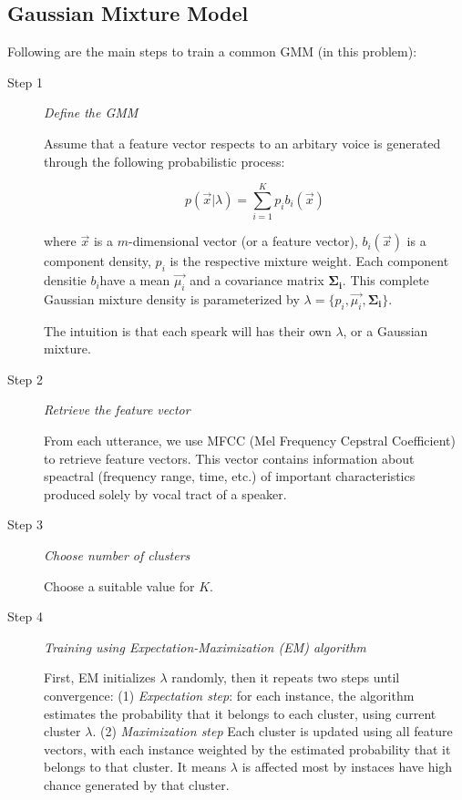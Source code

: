 \subsection*{Gaussian Mixture Model}

Following are the main steps to train a common GMM (in this problem):

\begin{description}

	\item[Step 1] \emph{Define the GMM}
	
	Assume that a feature vector respects to an arbitary voice is generated through the following probabilistic process:
	
	\begin{equation*}
		p(\vec{x} \vert \lambda) = \sum_{i = 1}^K p_ib_i(\vec{x})
	\end{equation*}
	
	where $\vec{x}$ is a $m$-dimensional vector (or a feature vector), $b_i(\vec{x})$ is a component density, $p_i$ is the respective mixture weight. Each component densitie $b_i $have a mean $\vec{\mu_i}$ and a covariance matrix $\bm{\Sigma_i}$. This complete Gaussian mixture density is parameterized by $\lambda = \{p_i, \vec{\mu_i}, \bm{\Sigma_i} \}$.
	
	The intuition is that each speark will has their own $\lambda$, or a Gaussian mixture.
	
	\item[Step 2] \emph{Retrieve the feature vector}
	
	From each utterance, we use MFCC (Mel Frequency Cepstral Coefficient) to retrieve feature vectors. This vector contains information about speactral (frequency range, time, etc.) of important characteristics produced solely by vocal tract of a speaker.
	
	\item[Step 3] \emph{Choose number of clusters}
	
	Choose a suitable value for $K$.
	
	\item[Step 4] \emph{Training using Expectation-Maximization (EM) algorithm} 
	
	First, EM initializes $\lambda$ randomly, then it repeats two steps until convergence: (1) \emph{Expectation step}: for each instance, the algorithm estimates the probability that it belongs to each cluster, using current cluster $\lambda$. (2) \emph{Maximization step} Each cluster is updated using all feature vectors, with each instance weighted by the estimated probability that it belongs to that cluster. It means $\lambda$ is affected most by instaces have high chance generated by that cluster.
	

\end{description}
